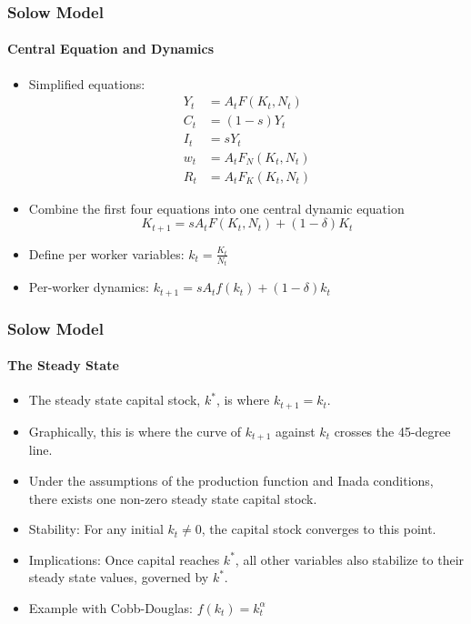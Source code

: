 \documentclass{beamer}
\begin{document}
\begin{frame}
    \frametitle{Solow Model}
    \framesubtitle{Central Equation and Dynamics}
    \begin{itemize}
        \item Simplified equations:
        \begin{align*}
            Y_t &= A_t F(K_t, N_t) \\
            C_t &= (1 - s)Y_t \\
            I_t &= sY_t \\
            w_t &= A_t F_N(K_t, N_t) \\
            R_t &= A_t F_K(K_t, N_t)
        \end{align*}
        \item Combine the first four equations into one central dynamic equation
        \pause
        \[ K_{t+1} = sA_t F(K_t, N_t) + (1 - \delta)K_t \]
        \item Define per worker variables: \( k_t = \frac{K_t}{N_t} \)
        \item Per-worker dynamics: \( k_{t+1} = sA_t f(k_t) + (1 - \delta)k_t \)
    \end{itemize}
\end{frame}

\begin{frame}
    \frametitle{Solow Model}
    \framesubtitle{The Steady State}
    \begin{itemize}
        \item The steady state capital stock, \( k^* \), is where \( k_{t+1} = k_t \).
        \item Graphically, this is where the curve of \( k_{t+1} \) against \( k_t \) crosses the 45-degree line.
        \item Under the assumptions of the production function and Inada conditions, there exists one non-zero steady state capital stock.
        \item Stability: For any initial \( k_t \neq 0 \), the capital stock converges to this point.
        \item Implications: Once capital reaches \( k^* \), all other variables also stabilize to their steady state values, governed by \( k^* \).
        \item Example with Cobb-Douglas: \( f(k_t) = k_t^\alpha \)
    \end{itemize}
\end{frame}


\end{document}
